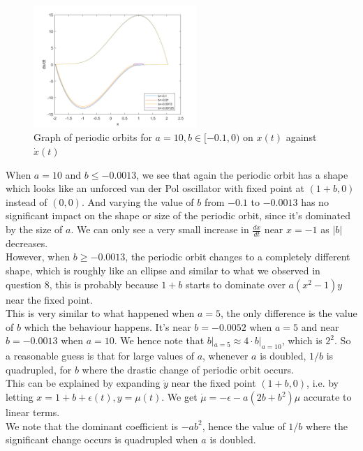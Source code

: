 \documentclass[10pt]{article}
\begin{document}
\begin{figure}[H]
\centering
\includegraphics[width=0.55\textwidth]{Files/q9,a=10.png}
\caption{Graph of periodic orbits for $a=10, b\in[-0.1,0)$ on $x(t)$ against $\dot{x}(t)$}
\end{figure}
\noindent When $a=10$ and $b\leq-0.0013$, we see that again the periodic orbit has a shape which looks like an unforced van der Pol oscillator with fixed point at $(1+b,0)$ instead of $(0,0)$. And varying the value of $b$ from $-0.1$ to $-0.0013$ has no significant impact on the shape or size of the periodic orbit, since it's dominated by the size of $a$. We can only see a very small increase in $\frac{dx}{dt}$ near $x=-1$ as $|b|$ decreases.\\
However, when $b\geq -0.0013$, the periodic orbit changes to a completely different shape, which is roughly like an ellipse and similar to what we observed in question 8, this is probably because $1+b$ starts to dominate over $a(x^2-1)y$ near the fixed point.\\
This is very similar to what happened when $a=5$, the only difference is the value of $b$ which the behaviour happens. It's near $b=-0.0052$ when $a=5$ and near $b=-0.0013$ when $a=10$. We hence note that $b|_{a=5}\approx 4 \cdot b|_{a=10}$, which is $2^2$. So a reasonable guess is that for large values of $a$, whenever $a$ is doubled, $1/b$ is quadrupled, for $b$ where the drastic change of periodic orbit occurs.\\
This can be explained by expanding $\dot{y}$ near the fixed point $(1+b,0)$, i.e. by letting $x=1+b+\epsilon(t),y=\mu(t)$. We get $\dot{\mu}=-\epsilon-a(2b+b^2)\mu$ accurate to linear terms.\\
We note that the dominant coefficient is $-ab^2$, hence the value of $1/b$ where the significant change occurs is quadrupled when $a$ is doubled.\\\\ 
\end{document}
